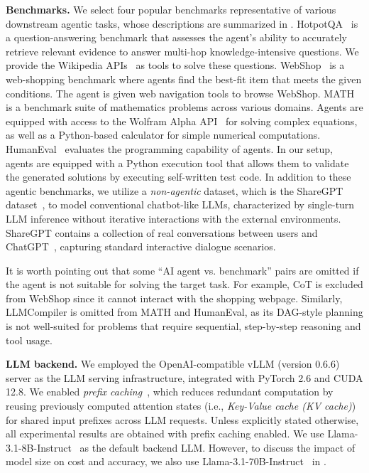 \textbf{Benchmarks.}
We select four popular benchmarks representative of various downstream agentic tasks, whose descriptions are summarized in . 
HotpotQA~\cite{hotpotqa} is a question-answering benchmark that assesses the agent's ability to accurately retrieve relevant evidence to answer multi-hop knowledge-intensive questions. We provide the Wikipedia APIs~\cite{wikipedia_api} as tools to solve these questions.
WebShop~\cite{webshop} is a web-shopping benchmark where agents find the best-fit item that meets the given conditions. The agent is given web navigation tools to browse WebShop.
MATH~\cite{math} is a benchmark suite of mathematics problems across various domains. Agents are equipped with access to the Wolfram Alpha API~\cite{wolfram_alpha_api} for solving complex equations, as well as a Python-based calculator for simple numerical computations.
HumanEval~\cite{humaneval} evaluates the programming capability of agents. In our setup, agents are equipped with a Python execution tool that allows them to validate the generated solutions by executing self-written test code.
In addition to these agentic benchmarks, we utilize a \emph{non-agentic} dataset, which is the ShareGPT dataset~\cite{sharegpt}, to model conventional chatbot-like LLMs, characterized by single-turn LLM inference without iterative interactions with the external environments. ShareGPT contains a collection of real conversations between users and ChatGPT~\cite{chatgpt}, capturing standard interactive dialogue scenarios.


It is worth pointing out that some ``AI agent vs. benchmark'' pairs are omitted if the agent is not suitable for solving the target task. For example, CoT is excluded from WebShop since it cannot interact with the shopping webpage. Similarly, LLMCompiler is omitted from MATH and HumanEval, as its DAG-style planning is not well-suited for problems that require sequential, step-by-step reasoning and tool usage.

\textbf{LLM backend.}
We employed the OpenAI-compatible vLLM (version 0.6.6) server as the LLM serving infrastructure, integrated with PyTorch 2.6 and CUDA 12.8. We enabled \emph{prefix caching}~\cite{vllm}, which reduces redundant computation by reusing previously computed attention states (i.e., \emph{Key-Value cache (KV cache)}) for shared input prefixes across LLM requests. Unless explicitly stated otherwise, all experimental results are obtained with prefix caching enabled. We use Llama-3.1-8B-Instruct~\cite{llama_3.1_8b_instruct} as the default backend LLM. However, to discuss the impact of model size on cost and accuracy, we also use Llama-3.1-70B-Instruct~\cite{llama_3.1_70b_instruct} in .

